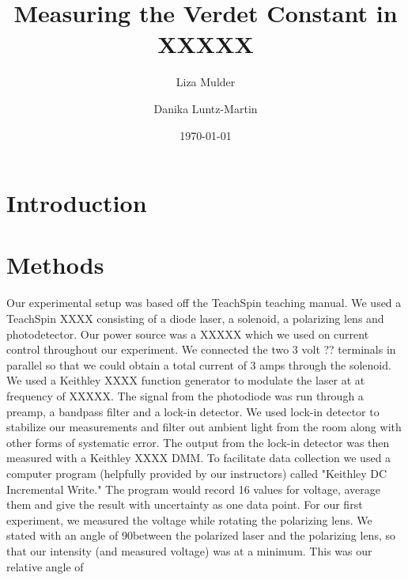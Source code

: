 \documentclass[prb,preprint]{revtex4-1}
\begin{document}

\title{Measuring the Verdet Constant in XXXXX}


\author{Liza Mulder}


\author{Danika Luntz-Martin}


\date{\today}

\begin{abstract}

\end{abstract}

\maketitle %


\section{Introduction} %

\section{Methods}

Our experimental setup was based off the TeachSpin teaching manual. We used a TeachSpin XXXX consisting of a diode laser, a solenoid, a polarizing lens and photodetector. Our power source was a XXXXX which we used on current control throughout our experiment. We connected the two 3 volt ??  terminals in parallel so that we could obtain a total current of 3 amps through the solenoid. We used a Keithley XXXX function generator to modulate the laser at at frequency of XXXXX. The signal from the photodiode was run through a preamp, a bandpass filter and a lock-in detector. We used lock-in detector to stabilize our measurements and filter out ambient light from the room along with other forms of systematic error.
The output from the lock-in detector was then measured with a Keithley XXXX DMM. To facilitate data collection we used a computer program (helpfully provided by our instructors) called "Keithley DC Incremental Write." The program would record 16 values for voltage, average them and give the result with uncertainty as one data point. 
For our first experiment, we measured the voltage while rotating the polarizing lens. We stated with an angle of 90\deg between the polarized laser and the polarizing lens, so that our intensity (and measured voltage) was at a minimum. This was our relative angle of 
\end{document}
